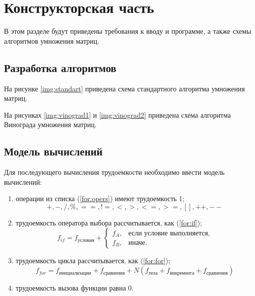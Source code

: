 \chapter{Конструкторская часть}
В этом разделе будут приведены требования к вводу и программе, а также схемы алгоритмов умножения матриц.

\section{Разработка алгоритмов}

На рисунке \ref{img:standart} приведена схема стандартного алгоритма умножения матриц.

На рисунках \ref{img:vinograd1} и \ref{img:vinograd2} приведена схема алгоритма Винограда умножения матриц.




\clearpage
{}
\clearpage
{}
\clearpage



\section{Модель вычислений}

Для последующего вычисления трудоемкости необходимо ввести модель вычислений:
\begin{enumerate}
	\item операции из списка (\ref{for:opers}) имеют трудоемкость 1;
	\begin{equation}
		\label{for:opers}
		+, -, /, \%, ==, !=, <, >, <=, >=, [], ++, {-}-
	\end{equation}
	\item трудоемкость оператора выбора  рассчитывается, как (\ref{for:if});
	\begin{equation}
		\label{for:if}
		f_{if} = f_{\text{условия}} +
		\begin{cases}
			f_A, & \text{если условие выполняется,}\\
			f_B, & \text{иначе.}
		\end{cases}
	\end{equation}
	\item трудоемкость цикла рассчитывается, как (\ref{for:for});
	\begin{equation}
		\label{for:for}
		f_{for} = f_{\text{инициализации}} + f_{\text{сравнения}} + N(f_{\text{тела}} + f_{\text{инкремента}} + f_{\text{сравнения}})
	\end{equation}
	\item трудоемкость вызова функции равна 0.
\end{enumerate}


